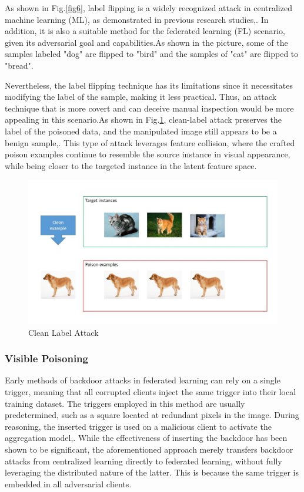 \documentclass[conference]{IEEEtran}
\begin{document}
As shown in Fig.\ref{fig6}, label flipping is a widely recognized attack in centralized machine learning (ML),
as demonstrated in previous research studies\cite{b54},\cite{b55}. In addition,
it is also a suitable method for the federated learning (FL) scenario,
given its adversarial goal and capabilities\cite{b56}.As shown in the picture,
some of the samples labeled "dog" are flipped to "bird" and the samples of "cat"
are flipped to "bread".


Nevertheless, the label flipping technique has its limitations since it necessitates
modifying the label of the sample, making it less practical. Thus, an attack
technique that is more covert and can deceive manual inspection would be more
appealing in this scenario.As shown in Fig.\ref{fig7}, clean-label attack preserves the label of the poisoned data,
and the manipulated image still appears to be a benign sample\cite{b57},\cite{b58}. This type of attack
leverages feature collision, where the crafted poison examples continue to
resemble the source instance in visual appearance, while being closer to the
targeted instance in the latent feature space.

\begin{figure}[htbp]
    \centerline{\includegraphics[width=0.8\linewidth,height=0.6\linewidth]{picture/f7.jpg}}
    \caption{Clean Label Attack}
    \label{fig7}
\end{figure}

\subsubsection{Visible Poisoning}
Early methods of  backdoor attacks in federated learning can rely on a single trigger,
meaning that all corrupted clients inject the same trigger into their local
training dataset. The triggers employed in this method are usually predetermined,
such as a square located at redundant pixels in the image. During reasoning,
the inserted trigger is used on a malicious client to activate the aggregation model\cite{b24},\cite{b27}.
While the effectiveness of inserting the backdoor has been shown to be significant,
the aforementioned approach merely transfers backdoor attacks from centralized
learning directly to federated learning, without fully leveraging
the distributed nature of the latter. This is
because the same trigger is embedded in all adversarial clients.
\end{document}
